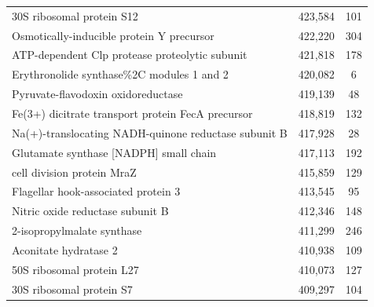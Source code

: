 \begin{singlespace}
\begin{longtable}{p{} cc}
                                                                 30S ribosomal protein S12 &                     423,584 &           101 \\
                                                 Osmotically-inducible protein Y precursor &                     422,220 &           304 \\
                                            ATP-dependent Clp protease proteolytic subunit &                     421,818 &           178 \\
                                                 Erythronolide synthase\%2C modules 1 and 2 &                     420,082 &             6 \\
                                                        Pyruvate-flavodoxin oxidoreductase &                     419,139 &            48 \\
                                         Fe(3+) dicitrate transport protein FecA precursor &                     418,819 &           132 \\
                                      Na(+)-translocating NADH-quinone reductase subunit B &                     417,928 &            28 \\
                                                    Glutamate synthase [NADPH] small chain &                     417,113 &           192 \\
                                                                cell division protein MraZ &                     415,859 &           129 \\
                                                       Flagellar hook-associated protein 3 &                     413,545 &            95 \\
                                                          Nitric oxide reductase subunit B &                     412,346 &           148 \\
                                                                2-isopropylmalate synthase &                     411,299 &           246 \\
                                                                     Aconitate hydratase 2 &                     410,938 &           109 \\
                                                                 50S ribosomal protein L27 &                     410,073 &           127 \\
                                                                  30S ribosomal protein S7 &                     409,297 &           104 \\

\end{longtable}
\end{singlespace}

